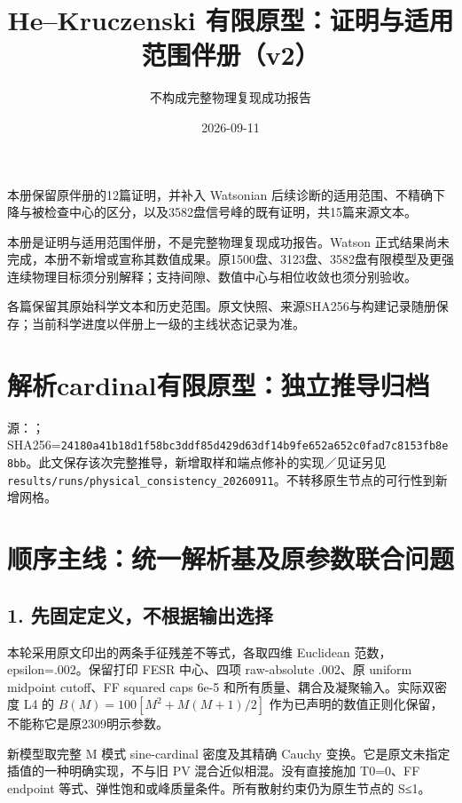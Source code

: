 \documentclass[
  10pt,
  a4paper,
]{article}
\title{He--Kruczenski 有限原型：证明与适用范围伴册（v2）}
\subtitle{不构成完整物理复现成功报告}
\author{}
\date{2026-09-11}
\begin{document}
\maketitle

{
\setcounter{tocdepth}{2}
\tableofcontents
}
本册保留原伴册的12篇证明，并补入 Watsonian
后续诊断的适用范围、不精确下降与被检查中心的区分，以及3582盘信号峰的既有证明，共15篇来源文本。

本册是证明与适用范围伴册，不是完整物理复现成功报告。Watson
正式结果尚未完成，本册不新增或宣称其数值成果。原1500盘、3123盘、3582盘有限模型及更强连续物理目标须分别解释；支持间隙、数值中心与相位收敛也须分别验收。

各篇保留其原始科学文本和历史范围。原文快照、来源SHA256与构建记录随册保存；当前科学进度以伴册上一级的主线状态记录为准。

\newpage

\section{解析cardinal有限原型：独立推导归档}\label{ux89e3ux6790cardinalux6709ux9650ux539fux578bux72ecux7acbux63a8ux5bfcux5f52ux6863}

源：；SHA256=\nolinkurl{24180a41b18d1f58bc3ddf85d429d63df14b9fe652a652c0fad7c8153fb8e8bb}。此文保存该次完整推导，新增取样和端点修补的实现／见证另见\texttt{results/runs/physical\_consistency\_20260911}。不转移原生节点的可行性到新增网格。

\section{顺序主线：统一解析基及原参数联合问题}\label{ux987aux5e8fux4e3bux7ebfux7edfux4e00ux89e3ux6790ux57faux53caux539fux53c2ux6570ux8054ux5408ux95eeux9898}

\subsection{1.
先固定定义，不根据输出选择}\label{ux5148ux56faux5b9aux5b9aux4e49ux4e0dux6839ux636eux8f93ux51faux9009ux62e9}

本轮采用原文印出的两条手征残差不等式，各取四维 Euclidean
范数，epsilon=.002。保留打印 FESR 中心、四项 raw-absolute .002、原
uniform midpoint cutoff、FF squared caps 6e-5
和所有质量、耦合及凝聚输入。实际双密度 L4 的 \(B(M)=100[M^2+M(M+1)/2]\)
作为已声明的数值正则化保留，不能称它是原2309明示参数。

新模型取完整 M 模式 sine-cardinal 密度及其精确 Cauchy
变换。它是原文未指定插值的一种明确实现，不与旧 PV
混合近似相混。没有直接施加 T0=0、FF endpoint
等式、弹性饱和或峰质量条件。所有散射约束仍为原生节点的
\textbar S\textbar≤1。
\end{document}
